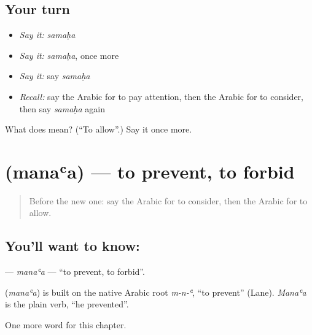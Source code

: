 \subsection*{Your turn}
\begin{itemize}
\raggedright
  \item \emph{Say it:} \emph{samaḥa}
  \item \emph{Say it:} \emph{samaḥa}, once more
  \item \emph{Say it:} say \emph{samaḥa}
  \item \emph{Recall:} say the Arabic for to pay attention, then the Arabic for to consider, then say \emph{samaḥa} again
\end{itemize}

\begin{tcolorbox}[breakable,colback=teal!4,colframe=teal!35!black,title={Before you move on}]
What does  mean? (\textquotedblleft{}To allow\textquotedblright{}.) Say it once more.
\end{tcolorbox}
\section[\texorpdfstring{\ar{منع} (manaʿa)}{منع (manaʿa)}]{ (manaʿa) — to prevent, to forbid}

\label{lesson:AR-C198-manaa}



\begin{quote}
Before the new one: say the Arabic for to consider, then the Arabic for to allow.
\end{quote}

\subsection*{You'll want to know: }
\textbf{} — \emph{manaʿa} — \textquotedblleft{}to prevent, to forbid\textquotedblright{}.

\begin{cousinweb}
\textbf{} (\emph{manaʿa}) is built on the native Arabic root \emph{m-n-ʿ}, \textquotedblleft{}to prevent\textquotedblright{} (Lane). \emph{Manaʿa} is the plain verb, \textquotedblleft{}he prevented\textquotedblright{}.
\end{cousinweb}

\begin{grammarlens}[title={What you've built}]
One more word for this chapter.
\end{grammarlens}

